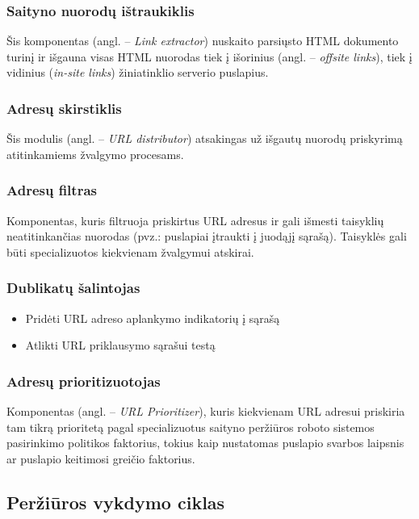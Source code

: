 \subsubsection{Saityno nuorodų ištraukiklis}

Šis komponentas (angl. -- \textit{Link extractor}) nuskaito parsiųsto HTML dokumento turinį ir išgauna visas HTML nuorodas tiek į išorinius (angl. -- \textit{offsite links}), tiek į vidinius (\textit{in-site links}) žiniatinklio serverio puslapius.

\subsubsection{Adresų skirstiklis}

Šis modulis (angl. -- \textit{URL distributor}) atsakingas už išgautų nuorodų priskyrimą atitinkamiems žvalgymo procesams.

\subsubsection{Adresų filtras}

Komponentas, kuris filtruoja priskirtus URL adresus ir gali išmesti taisyklių neatitinkančias nuorodas (pvz.: puslapiai įtraukti į juodąjį sąrašą). Taisyklės gali būti specializuotos kiekvienam žvalgymui atskirai.

\subsubsection{Dublikatų šalintojas}

\begin{itemize}
    \item Pridėti URL adreso aplankymo indikatorių į sąrašą
    \item Atlikti URL priklausymo sąrašui testą
\end{itemize}

\subsubsection{Adresų prioritizuotojas}

Komponentas (angl. -- \textit{URL Prioritizer}), kuris kiekvienam URL adresui priskiria tam tikrą prioritetą pagal specializuotus saityno peržiūros roboto sistemos pasirinkimo politikos faktorius, tokius kaip nustatomas puslapio svarbos laipsnis ar puslapio keitimosi greičio faktorius.


\subsection{Peržiūros vykdymo ciklas}

